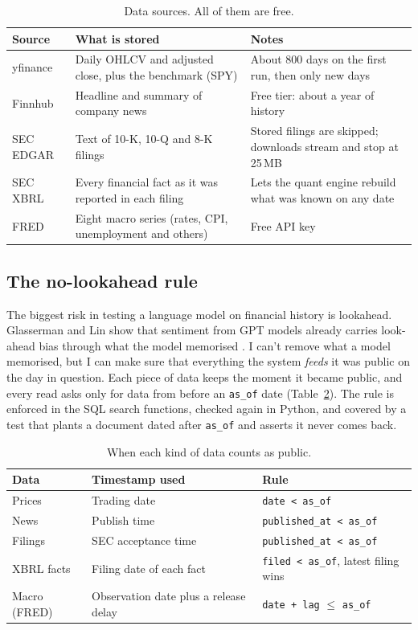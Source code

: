 \documentclass[11pt,a4paper]{article}
\newcommand{\code}[1]{\texttt{#1}}
\begin{document}
\begin{table}[htbp]
\centering\small
\begin{tabularx}{\linewidth}{@{}l X X@{}}
\toprule
Source & What is stored & Notes \\
\midrule
yfinance    & Daily OHLCV and adjusted close, plus the benchmark (SPY) & About 800 days on the first run, then only new days \\
Finnhub     & Headline and summary of company news & Free tier: about a year of history \\
SEC EDGAR   & Text of 10-K, 10-Q and 8-K filings & Stored filings are skipped; downloads stream and stop at 25\,MB \\
SEC XBRL    & Every financial fact as it was reported in each filing & Lets the quant engine rebuild what was known on any date \\
FRED        & Eight macro series (rates, CPI, unemployment and others) & Free API key \\
\bottomrule
\end{tabularx}
\caption{Data sources. All of them are free.}
\label{tab:sources}
\end{table}

\subsection{The no-lookahead rule}

The biggest risk in testing a language model on financial history is lookahead. Glasserman and Lin show
that sentiment from GPT models already carries look-ahead bias through what the model memorised
\cite{glasserman2023assessing}. I can't remove what a model memorised, but I can make sure that everything
the system \emph{feeds} it was public on the day in question. Each piece of data keeps the moment it
became public, and every read asks only for data from before an \code{as\_of} date
(Table~\ref{tab:lookahead}). The rule is enforced in the SQL search functions, checked again in Python,
and covered by a test that plants a document dated after \code{as\_of} and asserts it never comes back.

\begin{table}[htbp]
\centering\small
\begin{tabular}{@{}lll@{}}
\toprule
Data & Timestamp used & Rule \\
\midrule
Prices       & Trading date & \code{date < as\_of} \\
News         & Publish time & \code{published\_at < as\_of} \\
Filings      & SEC acceptance time & \code{published\_at < as\_of} \\
XBRL facts   & Filing date of each fact & \code{filed < as\_of}, latest filing wins \\
Macro (FRED) & Observation date plus a release delay & \code{date + lag} $\le$ \code{as\_of} \\
\bottomrule
\end{tabular}
\caption{When each kind of data counts as public.}
\label{tab:lookahead}
\end{table}
\end{document}
